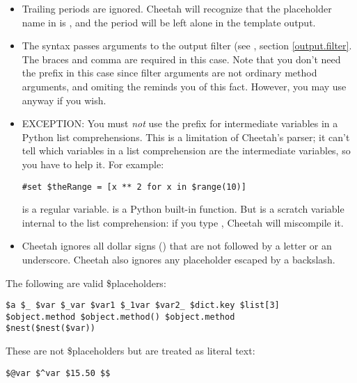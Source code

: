 \begin{itemize}
\item Trailing periods are ignored.  Cheetah will recognize that the placeholder
     name in  is , and the period will be left
     alone in the template output.
     
\item The syntax  passes arguments to
     the output filter (see , section \ref{output.filter}.
     The braces and comma are required in this case.  Note that you don't need
     the \code{\$} prefix in this case since filter arguments are not ordinary
     method arguments, and omiting the \code{\$} reminds you of this fact.
     However, you may use \code{\$} anyway if you wish.

\item EXCEPTION: You must {\em not} use the \code{\$} prefix for intermediate
     variables in a Python list comprehensions.  This is a limitation of
     Cheetah's parser; it can't tell which variables in a list comprehension
     are the intermediate variables, so you have to help it.  For example:
\begin{verbatim}
#set $theRange = [x ** 2 for x in $range(10)]
\end{verbatim}
      is a regular  variable.   is a
     Python built-in function.  But  is a scratch variable internal to
     the list comprehension: if you type , Cheetah will miscompile it.

\item Cheetah ignores all dollar signs (\code{\$}) that are not followed by a
     letter or an underscore.  Cheetah also ignores any placeholder escaped by a
     backslash. 
     
\end{itemize} 



The following are valid \$placeholders:
\begin{verbatim}
$a $_ $var $_var $var1 $_1var $var2_ $dict.key $list[3]
$object.method $object.method() $object.method
$nest($nest($var))
\end{verbatim}

These are not \$placeholders but are treated as literal text:
\begin{verbatim}
$@var $^var $15.50 $$
\end{verbatim}


